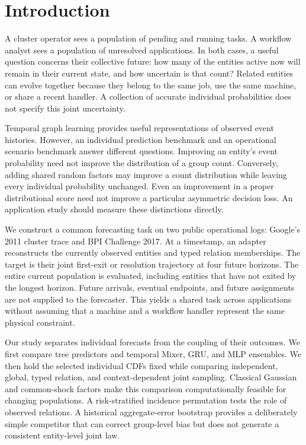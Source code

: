 \section{Introduction}
A cluster operator sees a population of pending and running tasks. A workflow
analyst sees a population of unresolved applications. In both cases, a useful
question concerns their collective future: how many of the entities active now
will remain in their current state, and how uncertain is that count? Related
entities can evolve together because they belong to the same job, use the same
machine, or share a recent handler. A collection of accurate individual
probabilities does not specify this joint uncertainty.

Temporal graph learning provides useful representations of observed event
histories. However, an individual prediction benchmark and an operational
scenario benchmark answer different questions. Improving an entity's event
probability need not improve the distribution of a group count. Conversely,
adding shared random factors may improve a count distribution while leaving
every individual probability unchanged. Even an improvement in a proper
distributional score need not improve a particular asymmetric decision loss.
An application study should measure these distinctions directly.

We construct a common forecasting task on two public operational logs:
Google's 2011 cluster trace and BPI Challenge 2017. At a timestamp, an adapter
reconstructs the currently observed entities and typed relation memberships.
The target is their joint first-exit or resolution trajectory at four future
horizons. The entire current population is evaluated, including entities that
have not exited by the longest horizon. Future arrivals, eventual endpoints,
and future assignments are not supplied to the forecaster. This yields a
shared task across applications without assuming that a machine and a workflow
handler represent the same physical constraint.

Our study separates individual forecasts from the coupling of their outcomes.
We first compare tree predictors and temporal Mixer, GRU, and MLP ensembles.
We then hold the selected individual CDFs fixed while comparing independent,
global, typed relation, and context-dependent joint sampling. Classical
Gaussian and common-shock factors make this comparison computationally
feasible for changing populations. A risk-stratified incidence permutation
tests the role of observed relations. A historical aggregate-error bootstrap
provides a deliberately simple competitor that can correct group-level bias
but does not generate a consistent entity-level joint law.

